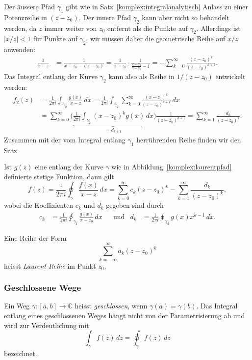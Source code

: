 Der äussere Pfad $\gamma_1$ gibt wie in Satz~\ref{komplex:integralanalytisch}
Anlass zu einer Potenzreihe in $(z-z_0)$.
Der innere Pfad $\gamma_2$ kann aber nicht so behandelt werden, da $z$ immer
weiter von $z_0$ entfernt als die Punkte auf $\gamma_2$.
Allerdings ist $|x/z| < 1$ für Punkte auf $\gamma_2$, wir müssen daher
die geometrische Reihe auf $x/z$ anwenden:
\begin{align*}
\frac{1}{x-z}
&=
\frac{1}{x-z_0-(z-z_0)}
=
\frac{1}{z-z_0}
\cdot
\frac{1}{\displaystyle\frac{x-z_0}{z-z_0}-1}
=
-\sum_{k=0}^\infty \frac{(x-z_0)^k}{(z-z_0)^{k+1}}.
\end{align*}
Das Integral entlang der Kurve $\gamma_2$ kann also als Reihe in $1/(z-z_0)$
entwickelt werden:
\begin{align*}
f_2(z)
&=
\frac{1}{2\pi i}\int_{\gamma_2} \frac{g(x)}{x-z}\,dx
=
\frac{1}{2\pi i}\int_{\gamma_2}\sum_{k=0}^\infty
\frac{(x-z_0)^k}{(z-z_0)^{k+1}}\,dx
\\
&=
\sum_{k=0}^\infty
\biggl(
\underbrace{\frac1{2\pi i}\int_{\gamma_2} (x-z_0)^kg(x)\,dx
}_{\displaystyle =d_{k+1}}
\biggr)
\frac1{(z-z_0)^{k+1}}
=\sum_{k=1}^\infty \frac{d_k}{(z-z_0)^k}.
\end{align*}
Zusammen mit der vom Integral entlang $\gamma_1$ herrührenden Reihe finden
wir den Satz
\begin{satz}
\label{komplex:laurentreihe}
Ist $g(z)$ eine entlang der Kurve $\gamma$ wie in
Abbildung~\ref{komplex:laurentpfad} definierte stetige Funktion, dann gilt
\[
f(z)=\frac1{2\pi i}\oint_{\gamma} \frac{f(x)}{x-z}\,dx
=
\sum_{k=0}^{\infty} c_k(z-z_0)^k-\sum_{k=1}^\infty \frac{d_k}{(z-z_0)^k},
\]
wobei die Koeffizienten $c_k$ und $d_k$ gegeben sind durch
\[
\begin{aligned}
c_k&=\frac1{2\pi i}\oint_{\gamma_1} \frac{g(x)}{x-z_0}\,dx
&&
\text{und}
&
d_k&=\frac1{2\pi i}\oint_{\gamma_2} g(x)x^{k-1}\,dx.
\end{aligned}
\]
\end{satz}

\begin{definition}
Eine Reihe der Form
\[
\sum_{k=-\infty}^\infty a_k(z-z_0)^k
\]
heisst {\em Laurent-Reihe }
im Punkt $z_0$.
\end{definition}


%
%
\subsubsection{Geschlossene Wege}
\begin{definition}
Ein Weg $\gamma\colon[a,b]\to\mathbb C$ heisst {\em geschlossen}, wenn
$\gamma(a)=\gamma(b)$.
Das Integral entlang eines geschlossenen Weges hängt nicht von der
Parametrisierung ab und wird zur Verdeutlichung mit
\[
\int_{\gamma}f(z)\,dz
=
\oint_{\gamma}f(z)\,dz
\]
bezeichnet.
\end{definition}

